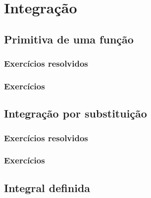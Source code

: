 
\chapter{Integração}\label{cap:integracao}

\emconstrucao

\section{Primitiva de uma função}
\construirSec
\subsection*{Exercícios resolvidos}

\construirExeresol


\subsection*{Exercícios}

\construirExer


\section{Integração por substituição}
\construirSec

\subsection*{Exercícios resolvidos}

\construirExeresol


\subsection*{Exercícios}

\construirExer


\section{Integral definida}
\construirSec

